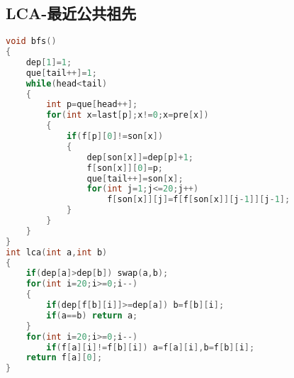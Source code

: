 \subsection{LCA-最近公共祖先}
    \begin{lstlisting}[language=c++]
void bfs()
{
    dep[1]=1;
    que[tail++]=1;
    while(head<tail)
    {
        int p=que[head++];
        for(int x=last[p];x!=0;x=pre[x])
        {
            if(f[p][0]!=son[x])
            {
                dep[son[x]]=dep[p]+1;
                f[son[x]][0]=p;
                que[tail++]=son[x];
                for(int j=1;j<=20;j++)
                    f[son[x]][j]=f[f[son[x]][j-1]][j-1];
            }    
        }    
    }
}
int lca(int a,int b)
{
    if(dep[a]>dep[b]) swap(a,b);
    for(int i=20;i>=0;i--)
    {
        if(dep[f[b][i]]>=dep[a]) b=f[b][i];
        if(a==b) return a;    
    }    
    for(int i=20;i>=0;i--)
        if(f[a][i]!=f[b][i]) a=f[a][i],b=f[b][i];
    return f[a][0];
}
    \end{lstlisting}
